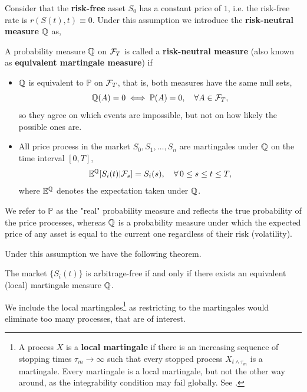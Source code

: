 Consider that the \textbf{risk-free} asset $S_0$ has a constant price of $1$, i.e. the risk-free rate is $r(S(t), t) \equiv 0$.
Under this assumption we introduce the \textbf{risk-neutral measure} $\mathbb{Q}$ as,
\begin{definition}\label{def:risk_neutral_measure}
    A probability measure $\mathbb{Q}$ on $\mathcal{F}_T$ is called a \textbf{risk-neutral measure} (also known as \textbf{equivalent martingale measure}) if
    \begin{itemize}
        \item $\mathbb{Q}$ is equivalent to $\mathbb{P}$ on $\mathcal{F}_T$, that is, both measures have the same null sets,
            \begin{equation*}
                \mathbb{Q}(A) = 0 \iff \mathbb{P}(A) = 0, \quad \forall A \in \mathcal{F}_T,
            \end{equation*}
            so they agree on which events are impossible, but not on how likely the possible ones are.
        \item All price process in the market $S_0, S_1, \dots, S_n$ are martingales under $\mathbb{Q}$ on the time interval $[0, T]$,
            \begin{equation*}
                \mathbb{E}^{\mathbb{Q}}[S_i(t) | \mathcal{F}_s] = S_i(s), \quad \forall\, 0 \leq s \leq t \leq T,
            \end{equation*}
            where $\mathbb{E}^{\mathbb{Q}}$ denotes the expectation taken under $\mathbb{Q}$.
    \end{itemize}
\end{definition}
We refer to $\mathbb{P}$ as the "real" probability measure and reflects the true probability of the price processes,
whereas $\mathbb{Q}$ is a probability measure under which the expected price of any asset is equal to the current one regardless of their risk (volatility).

Under this assumption we have the following theorem.
\begin{theorem}\label{thm:1_fundamental_thm}
    The market $\{ S_i(t) \}$ is arbitrage-free if and only if there exists an equivalent (local) martingale measure $\mathbb{Q}$.
\end{theorem}
We include the local martingales\footnote{
    A process $X$ is a \textbf{local martingale} if there is an increasing sequence of stopping times $\tau_m \to \infty$ such that every stopped process $X_{t \wedge \tau_m}$ is a martingale.
    Every martingale is a local martingale,
    but not the other way around,
    as the integrability condition may fail globally.
    See \cite[Ch.~7]{steele_stochastic}.
} as restricting to the martingales would eliminate too many processes,
that are of interest.

